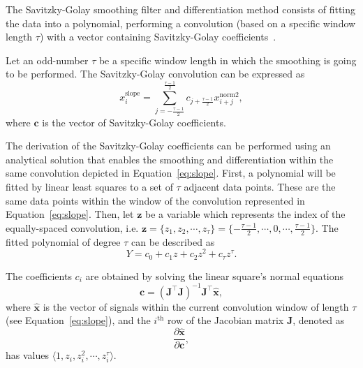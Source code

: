 The Savitzky-Golay smoothing filter and differentiation method consists of fitting the data into a polynomial, performing a convolution (based on a specific window length $\tau$) with a vector containing Savitzky-Golay coefficients~\cite{madden1978}.

Let an odd-number $\tau$ be a specific window length in which the smoothing is going to be performed. The Savitzky-Golay convolution can be expressed as
\begin{equation}
  \label{eq:slope}
  {x}^{\text{slope}}_{i} = \sum\limits_{j=-\frac{\tau-1}{2}}^{\frac{\tau-1}{2}} {c}_{j+\frac{\tau-1}{2}} {x}^{\text{norm2}}_{i+j},
\end{equation}
where $\mathbf{c}$ is the vector of Savitzky-Golay coefficients.

The derivation of the Savitzky-Golay coefficients can be performed using an analytical solution that enables the smoothing and differentiation within the same convolution depicted in Equation~\ref{eq:slope}. First, a polynomial will be fitted by linear least squares to a set of $\tau$ adjacent data points. These are the same data points within the window of the convolution represented in Equation~\ref{eq:slope}. Then, let $\mathbf{z}$ be a variable which represents the index of the equally-spaced convolution, i.e. $\mathbf{z} = \{ {z}_{1}, {z}_{2}, \cdots, {z}_{\tau} \} = \{ -\frac{\tau-1}{2}, \cdots, 0, \cdots, \frac{\tau-1}{2}\}$. The fitted polynomial of degree $\tau$ can be described as
\begin{equation}
  \label{eq:sg.polynomial}
  Y = {c}_{0} + {c}_{1}{z} + {c}_{2}{z}^{2} + {c}_{\tau}{z}^{\tau}.
\end{equation}

The coefficients $c_i$ are obtained by solving the linear square's normal equations
\begin{equation}
  \label{eq:savitzky.golay.coeff}
  \mathbf{c} = {\left( \mathbf{J}^{\intercal} \mathbf{J} \right)}^{-1} \mathbf{J}^{\intercal} \mathbf{\hat{x}},
\end{equation}
where $\mathbf{\hat{x}} $ is the vector of signals within the current convolution window of length $\tau$ (see Equation~\ref{eq:slope}), and the  $i^{\text{th}}$ row of the Jacobian matrix $\mathbf{J}$, denoted as
\begin{equation}
  \label{eq:savitzky.golay.jacob}
  \frac{\partial \mathbf{\hat{x}} }{\partial \mathbf{c}},
\end{equation}
has values $ \langle 1, {z}_{i}, {z}_{i}^{2}, \cdots, {z}_{i}^{\tau} \rangle$.

